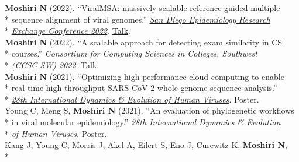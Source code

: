 \documentclass[margin,line]{res}
\begin{document}
\begin{resume}
\hspace*{4mm} \textbf{Moshiri N} (2022). ``ViralMSA: massively scalable reference-guided multiple\\*
\hspace*{9mm} sequence alignment of viral genomes.'' \href{https://publichealth.sdsu.edu/epiexchange}{\textit{San Diego Epidemiology Research}}\\*\vspace{2mm}
\hspace*{8mm} \href{https://publichealth.sdsu.edu/epiexchange}{\textit{Exchange Conference 2022}}. \href{https://docs.google.com/document/d/e/2PACX-1vTufgGn-94tzBuzs1MXideQPxZApXW0EvSHIyfKQX8xdXPvwVo1H3C4WbWSgmp67BbERnjzc_tkYqdm/pub}{Talk}.\\
\hspace*{4mm} \textbf{Moshiri N} (2022). ``A scalable approach for detecting exam similarity in CS\\*
\hspace*{9mm} courses.'' \textit{Consortium for Computing Sciences in Colleges, Southwest}\\*\vspace{2mm}
\hspace*{8mm} \textit{(CCSC-SW) 2022}. Talk.\\
\hspace*{4mm} \textbf{Moshiri N} (2021). ``Optimizing high-performance cloud computing to enable\\*
\hspace*{9mm} real-time high-throughput SARS-CoV-2 whole genome sequence analysis.''\\*\vspace{2mm}
\hspace*{8mm} \href{https://cpd.ucsd.edu/hivdynamics/}{\textit{28th International Dynamics \& Evolution of Human Viruses}}. Poster.\\
\hspace*{4mm} Young C, Meng S, \textbf{Moshiri N} (2021). ``An evaluation of phylogenetic workflows\\*
\hspace*{9mm} in viral molecular epidemiology.'' \href{https://cpd.ucsd.edu/hivdynamics/}{\textit{28th International Dynamics \& Evolution}}\\*\vspace{2mm}
\hspace*{8mm} \href{https://cpd.ucsd.edu/hivdynamics/}{\textit{of Human Viruses}}. Poster.\\
\hspace*{4mm} Kang J, Young C, Morris J, Akel A, Eilert S, Eno J, Curewitz K, \textbf{Moshiri N},\\*

\end{resume}
\end{document}
